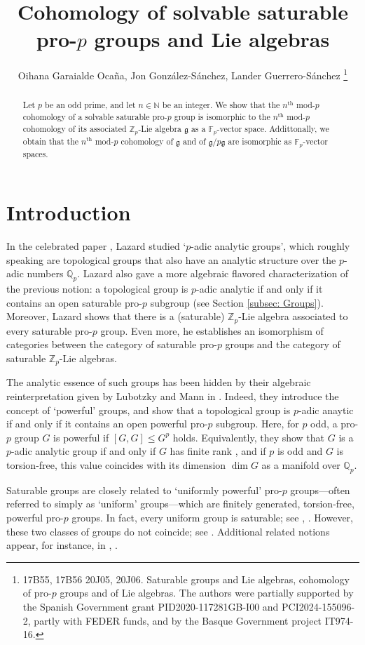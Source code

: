 \documentclass[11pt]{article}
\title{Cohomology of solvable saturable pro-$p$ groups and Lie algebras}
\author{Oihana Garaialde Oca\~na, Jon Gonz\'alez-S\'anchez, Lander Guerrero-S\'anchez
 \thanks{\noindent{\itshape 2010 Mathematics Subject Classification.}
     17B55, 17B56 20J05, 20J06. 
    \noindent {\itshape Keywords.} 
    Saturable groups and Lie algebras, cohomology of pro-$p$ groups and of Lie algebras.
    \noindent The  authors were partially supported by the Spanish Government grant  PID2020-117281GB-I00 and PCI2024-155096-2, partly
with FEDER funds, and by the Basque Government project IT974-16.}}
\newcommand{\N}{\mathbb{N}}
\newcommand{\Z}{\mathbb{Z}}
\newcommand{\Q}{\mathbb{Q}}
\newcommand{\F}{\mathbb{F}}
\newcommand{\Qp}{\mathbb{Q}_p}
\newcommand{\g}{\mathfrak{g}}
\theoremstyle{plain}
\theoremstyle{definition}
\begin{document}
\maketitle
	
\begin{abstract} Let $p$ be an odd prime, and let $n\in \N$ be an integer. We show that the $n^{\text{th}}$ mod-$p$ cohomology of a solvable saturable pro-$p$ group is isomorphic to the $n^{\text{th}}$ mod-$p$ cohomology of its associated $\Z_p$-Lie algebra $\g$ as a $\F_p$-vector space. Addittonally, we obtain that the $n^{\text{th}}$ mod-$p$ cohomology of $\g$ and of $\g/p\g$ are isomorphic as $\F_p$-vector spaces.
\end{abstract}



\section{Introduction}

In the celebrated paper  \cite{lazard65}, Lazard studied `$p$-adic analytic groups', which roughly speaking are topological groups that also have an analytic structure over the $p$-adic numbers $\Qp$. Lazard also gave a more algebraic flavored characterization of the previous notion: a topological group is $p$-adic analytic if and only if it contains an open saturable pro-$p$ subgroup (see Section \ref{subsec: Groups}). Moreover, Lazard shows that there is a (saturable) $\Z_p$-Lie algebra associated to every saturable pro-$p$ group. Even more, he establishes an isomorphism of categories between the category of saturable pro-$p$ groups and the category of saturable $\Z_p$-Lie algebras. 

The analytic essence of such groups has been hidden by their algebraic reinterpretation given by Lubotzky and Mann in \cite{LMpowerful}. Indeed, they introduce the concept of `powerful' groups, and show that a topological group is $p$-adic anaytic if and only if it contains an open powerful pro-$p$ subgroup. Here, for $p$ odd, a pro-$p$ group $G$ is powerful if $[G,G]\leq G^p$ holds. Equivalently, they show that $G$ is a $p$-adic analytic group if and only if $G$ has finite rank  \cite{LMpowerfulII}, and if $p$ is odd and $G$ is  torsion-free, this value coincides with its dimension $\dim G$ as a manifold over $\Q_p$. 


Saturable groups are closely related to `uniformly powerful' pro-$p$ groups—often referred to simply as `uniform' groups—which are finitely generated, torsion-free, powerful pro-$p$ groups. In fact, every uniform group is saturable; see \cite{LMpowerfulII}, \cite{FGJ}. However, these two classes of groups do not coincide; see \cite{klopsch05}. Additional related notions appear, for instance, in \cite{gonzalez07}, \cite{gonzalezjaikin}.
\end{document}
